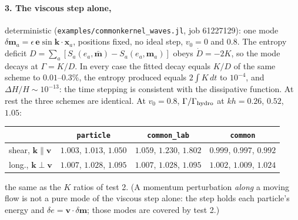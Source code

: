 \documentclass[11pt,aps,preprint,nofootinbib,superscriptaddress,tightenlines]{revtex4-2}
\let\oldparagraph\paragraph
\renewcommand{\paragraph}{\par\bigskip\oldparagraph}
\begin{document}
\paragraph{3. The viscous step alone,} deterministic (\texttt{examples/commonkernel\_waves.jl}, job 61227129): one mode
$\delta\bm m_a=\epsilon\,\bm e\sin\bm k\cdot\bm x_a$, positions fixed, no ideal step, $v_0=0$ and $0.8$.  The entropy deficit
$D=\sum_a[S_a(e_a,\bar{\bm m})-S_a(e_a,\bm m_a)]$ obeys $\dot D=-2K$, so the mode decays at $\Gamma=K/D$.  In every case the fitted
decay equals $K/D$ of the same scheme to $0.01$--$0.3\%$, the entropy produced equals $2\!\int\!K\,dt$ to $10^{-4}$, and
$\Delta H/H\sim10^{-13}$: the time stepping is consistent with the dissipative function.  At rest the three schemes are
identical.  At $v_0=0.8$, $\Gamma/\Gamma_{\rm hydro}$ at $kh=0.26$, $0.52$, $1.05$:
\begin{center}
\begin{tabular}{lccc}
\hline
 & \texttt{particle} & \texttt{common\_lab} & \texttt{common} \\ \hline
shear, $\bm k\parallel\bm v$ & $1.003$, $1.013$, $1.050$ & $1.059$, $1.230$, $1.802$ & $0.999$, $0.997$, $0.992$ \\
long., $\bm k\perp\bm v$ & $1.007$, $1.028$, $1.095$ & $1.007$, $1.028$, $1.095$ & $1.002$, $1.009$, $1.024$ \\
\hline
\end{tabular}
\end{center}
the same as the $K$ ratios of test 2.  (A momentum perturbation \emph{along} a moving flow is not a pure mode of the
viscous step alone: the step holds each particle's energy and $\delta e=\bm v\cdot\delta\bm m$; those modes are covered by test 2.)
\end{document}
